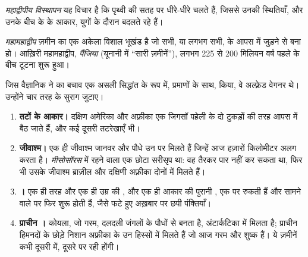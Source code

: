 \begin{definition}[महाद्वीपीय विस्थापन]\label{def:g7:plate-tectonics:continental-drift}
\emph{महाद्वीपीय विस्थापन} यह विचार है कि
 पृथ्वी की सतह पर धीरे-धीरे चलते हैं, जिससे उनकी स्थितियाँ, और उनके
बीच के  के आकार, युगों के दौरान बदलते
रहे हैं।
\end{definition}

\begin{definition}[महामहाद्वीप]\label{def:g7:plate-tectonics:supercontinent}
\emph{महामहाद्वीप} ज़मीन का एक अकेला विशाल भूखंड है जो
सभी, या लगभग सभी,  के आपस में जुड़ने से बना हो। आख़िरी
महामहाद्वीप, \emph{पैंजिया} (यूनानी में ``सारी ज़मीनें''),
लगभग 225 से 200 मिलियन वर्ष पहले के बीच टूटना शुरू हुआ।
\end{definition}

जिस वैज्ञानिक ने  का बचाव एक असली सिद्धांत के रूप में,
प्रमाणों के साथ, किया, वे अल्फ़्रेड वेगनर थे। उन्होंने चार तरह के सुराग जुटाए।

\begin{enumerate}
  \item \textbf{तटों के आकार।} दक्षिण अमेरिका और अफ़्रीका एक जिगसॉ पहेली के दो
        टुकड़ों की तरह आपस में बैठ जाते हैं, और कई दूसरी तटरेखाएँ
        भी।
  \item \textbf{जीवाश्म।} एक ही जीवाश्म जानवर और पौधे उन  पर मिलते
        हैं जिन्हें आज हज़ारों किलोमीटर  अलग करता है। \emph{मीसोसॉरस}
         में रहने वाला एक छोटा सरीसृप था: वह तैरकर  पार नहीं कर
        सकता था, फिर भी उसके जीवाश्म ब्राज़ील और दक्षिणी अफ़्रीका दोनों में
        मिलते हैं।
  \item \textbf{।} एक ही तरह और एक ही उम्र की , और एक ही
        आकार की पुरानी , एक  पर रुकती हैं और सामने वाले  पर
        फिर शुरू होती हैं, जैसे फटे हुए अख़बार पर छपी पंक्तियाँ।
  \item \textbf{प्राचीन ।} कोयला, जो गरम, दलदली जंगलों के पौधों से बनता
        है, अंटार्कटिका में मिलता है; प्राचीन हिमनदों के छोड़े निशान अफ़्रीका के
        उन हिस्सों में मिलते हैं जो आज गरम और शुष्क हैं। ये ज़मीनें कभी दूसरी
         में, दूसरे  पर रही
        होंगी।
\end{enumerate}

